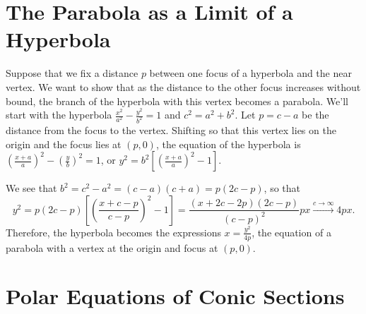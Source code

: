 \nofiles\documentclass{article}
\newcommand{\colorone}{blue}
\begin{document}
\section{The Parabola as a Limit of a Hyperbola}

Suppose that we fix a distance $p$ between one focus of a hyperbola and the near vertex.  We want to show that as the distance to the other focus increases without bound, the branch of the hyperbola with this vertex becomes a parabola.  We'll start with the hyperbola $\frac{x^2}{a^2}-\frac{y^2}{b^2}=1$ and $c^2=a^2+b^2$.  Let $p=c-a$ be the distance from the focus to the vertex.  Shifting so that this vertex lies on the origin and the focus lies at $(p,0)$, the equation of the hyperbola is $(\frac{x+a}a)^2-(\frac yb)^2=1$, or $y^2=b^2[(\frac{x+a}a)^2-1]$.
\begin{center}
\end{center}
We see that $b^2=c^2-a^2=(c-a)(c+a)=p(2c-p)$, so that
\[
 y^2=p(2c-p)\left[\left(\frac{x+c-p}{c-p}\right)^2-1\right]
 =\frac{(x+2c-2p)(2c-p)}{(c-p)^2}px
 \mathrel{\overset{c\to\infty}{\longrightarrow}}4px.
\]
Therefore, the hyperbola becomes the expressions $x=\frac{y^2}{4p}$, the equation of a parabola with a vertex at the origin and focus at $(p,0)$.

\section{Polar Equations of Conic Sections}
\end{document}
